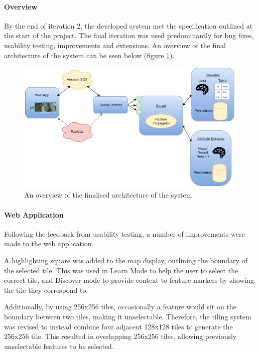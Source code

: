 \paragraph{Overview\\}
By the end of iteration 2, the developed system met the specification outlined at the start of the project. The final iteration was used predominantly for bug fixes, usability testing, improvements and extensions. 
An overview of the final architecture of the system can be seen below (figure \ref{fig:iteration3_overview}).
\begin{figure}[H]
    \centering
    \includegraphics[width=\textwidth]{figs/4/iteration3_overview}
    \caption{An overview of the finalised architecture of the system}
    \label{fig:iteration3_overview}
\end{figure}

\paragraph{Web Application\\}
Following the feedback from usability testing, a number of improvements were made to the web application.

A highlighting square was added to the map display, outlining the boundary of the selected tile. This was used in Learn Mode to help the user to select the correct tile, and Discover mode to provide context to feature markers by showing the tile they correspond to. 

Additionally, by using 256x256 tiles, occasionally a feature would sit on the boundary between two tiles, making it unselectable. Therefore, the tiling system was revised to instead combine four adjacent 128x128 tiles to generate the 256x256 tile. This resulted in overlapping 256x256 tiles, allowing previously unselectable features to be selected. 

